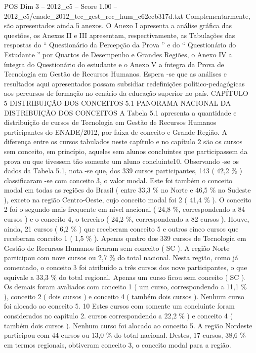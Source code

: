 \begin{textsample}{POS Dim 3 – 2012\_c5 – Score 1.00 – 2012\_c5/enade\_2012\_tec\_gest\_rec\_hum\_c62ecb317d.txt}
Complementarmente, são apresentados ainda 5 anexos.
O Anexo I apresenta a análise gráfica das questões, os Anexos II e III apresentam, respectivamente, as Tabulações das respostas do “ Questionário da Percepção da Prova ” e do “ Questionário do Estudante ” por Quartos de Desempenho e Grandes Regiões, o Anexo IV a íntegra do Questionário do estudante e o Anexo V a íntegra da Prova de Tecnologia em Gestão de Recursos Humanos.
Espera -se que as análises e resultados aqui apresentados possam subsidiar redefinições político-pedagógicas aos percursos de formação no cenário da educação superior no país.
CAPÍTULO 5 DISTRIBUIÇÃO DOS CONCEITOS 5.1 PANORAMA NACIONAL DA DISTRIBUIÇÃO DOS CONCEITOS A Tabela 5.1 apresenta a quantidade e distribuição de cursos de Tecnologia em Gestão de Recursos Humanos participantes do ENADE/2012, por faixa de conceito e Grande Região.
A diferença entre os cursos tabulados neste capítulo e no capítulo 2 são os cursos sem conceito, em princípio, aqueles sem alunos concluintes que participassem da prova ou que tivessem tão somente um aluno concluinte10.
Observando -se os dados da Tabela 5.1, nota -se que, dos 339 cursos participantes, 143 ( 42,2 \% ) classificaram -se com conceito 3, o valor modal.
Este foi também o conceito modal em todas as regiões do Brasil ( entre 33,3 \% no Norte e 46,5 \% no Sudeste ), exceto na região Centro-Oeste, cujo conceito modal foi 2 ( 41,4 \% ).
O conceito 2 foi o segundo mais frequente em nível nacional ( 24,8 \%, correspondendo a 84 cursos ) e o conceito 4, o terceiro ( 24,2 \%, correspondendo a 82 cursos ).
Houve, ainda, 21 cursos ( 6,2 \% ) que receberam conceito 5 e outros cinco cursos que receberam conceito 1 ( 1,5 \% ).
Apenas quatro dos 339 cursos de Tecnologia em Gestão de Recursos Humanos ficaram sem conceito ( SC ).
A região Norte participou com nove cursos ou 2,7 \% do total nacional.
Nesta região, como já comentado, o conceito 3 foi atribuído a três cursos dos nove participantes, o que equivale a 33,3 \% do total regional.
Apenas um curso ficou sem conceito ( SC ).
Os demais foram avaliados com conceito 1 ( um curso, correspondendo a 11,1 \% ), conceito 2 ( dois cursos ) e conceito 4 ( também dois cursos ).
Nenhum curso foi alocado ao conceito 5. 10 Estes cursos com somente um concluinte foram considerados no capítulo 2. cursos correspondendo a 22,2 \% ) e conceito 4 ( também dois cursos ).
Nenhum curso foi alocado ao conceito 5.
A região Nordeste participou com 44 cursos ou 13,0 \% do total nacional.
Destes, 17 cursos, 38,6 \% em termos regionais, obtiveram conceito 3, o conceito modal para a região.

\end{textsample}
